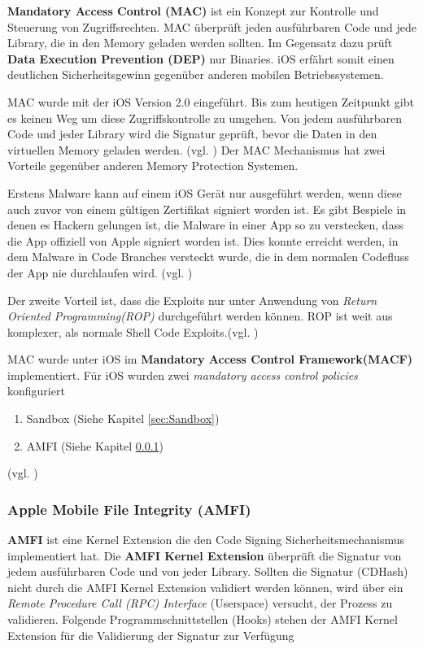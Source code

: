  \textbf{Mandatory Access Control (MAC)} ist ein Konzept zur Kontrolle und Steuerung von Zugriffsrechten. MAC überprüft jeden ausführbaren Code und jede Library, die in den Memory geladen werden sollten. Im Gegensatz dazu prüft \textbf{Data Execution Prevention (DEP)} nur Binaries. iOS erfährt somit einen deutlichen Sicherheitsgewinn gegenüber anderen mobilen Betriebssystemen. \par 
 MAC wurde mit der iOS Version 2.0 eingeführt. Bis zum heutigen Zeitpunkt gibt es keinen Weg um diese Zugriffskontrolle zu umgehen. Von jedem ausführbaren Code und jeder Library wird die Signatur geprüft, bevor die Daten in den virtuellen Memory geladen werden. (vgl. \cite{iOSSec[5], Hacking[1]})
Der MAC Mechanismus hat zwei Vorteile gegenüber anderen Memory Protection Systemen. \par 
Erstens Malware kann auf einem iOS Gerät nur ausgeführt werden, wenn diese auch zuvor von einem gültigen Zertifikat signiert worden ist. Es gibt Bespiele in denen es Hackern gelungen ist, die Malware in einer App so zu verstecken, dass die App offiziell von Apple signiert worden ist. Dies konnte erreicht werden, in dem Malware in Code Branches versteckt wurde, die in dem normalen Codefluss der App nie durchlaufen wird. (vgl. \cite{iOSSec[5], Hacking[1]}) \par
 Der zweite Vorteil ist, dass die Exploits nur unter Anwendung von \textit{ \glqq Return Oriented Programming(ROP)\grqq{} } durchgeführt werden können. ROP ist weit aus komplexer, als normale Shell Code Exploits.(vgl. \cite{Architecture[1], Architecture[2], Architecture[3], ROP[1], ROP[2], iOSSec[5], Hacking[1]})

MAC wurde unter iOS im \textbf{Mandatory Access Control Framework(MACF)} implementiert. Für iOS wurden zwei \textit{\glqq mandatory access control policies\grqq{}} konfiguriert
\begin{enumerate}
   \item Sandbox (Siehe Kapitel \ref{sec:Sandbox})
   \item AMFI (Siehe Kapitel \ref{sec:AMFI})
\end{enumerate}
(vgl. \cite{iOSSec[5], Hacking[1]})

\subsubsection{Apple Mobile File Integrity (AMFI)}
\label{sec:AMFI}
\textbf{AMFI } ist eine Kernel Extension die den Code Signing Sicherheitsmechanismus implementiert hat. Die \textbf{AMFI Kernel Extension} überprüft die Signatur von jedem ausführbaren Code und von jeder Library. Sollten die Signatur (CDHash) nicht durch die AMFI Kernel Extension validiert werden können, wird über ein \textit{\glqq Remote Procedure Call (RPC) Interface\grqq{}} (Userspace) versucht, der Prozess zu validieren. Folgende Programmschnittstellen (Hooks) stehen der AMFI Kernel Extension für die Validierung der Signatur zur Verfügung


